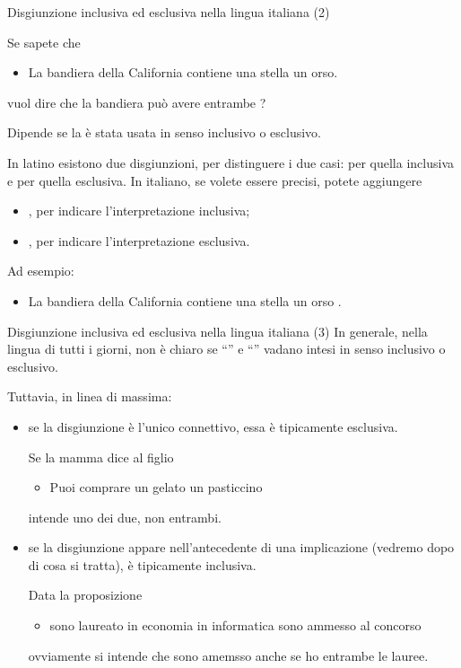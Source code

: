 \documentclass[aspectratio=169,10pt,dvipsnames,handout]{beamer}
\begin{document}
\begin{frame}{Disgiunzione inclusiva ed esclusiva nella lingua italiana (2)}
    \begin{example}
        Se sapete che
        \begin{itemize}
            \item La bandiera della California contiene una stella  un orso.
        \end{itemize}
        vuol dire che la bandiera può avere entrambe ?
    \end{example}

    \pause
    \medskip
    Dipende se la  è stata usata in senso inclusivo o esclusivo.

    \smallskip
    In latino esistono due disgiunzioni, per distinguere i due casi:  per quella inclusiva e  per quella esclusiva. In italiano, se volete essere precisi, potete aggiungere
    \begin{itemize}
        \item {}, per indicare l'interpretazione inclusiva;
        \item  {}, per indicare l'interpretazione esclusiva.
    \end{itemize}
    Ad esempio:
    \begin{itemize}
        \item La bandiera della California contiene una stella  un orso .
    \end{itemize}
\end{frame}

\begin{frame}{Disgiunzione inclusiva ed esclusiva nella lingua italiana (3)}
    In generale, nella lingua di tutti i giorni, non è chiaro se ``''  e ``'' vadano intesi in senso inclusivo o esclusivo.

    \medskip
    Tuttavia, in linea di massima:
    \begin{itemize}
        \item se la disgiunzione è l'unico connettivo, essa è tipicamente esclusiva.

        \medskip
        Se la mamma dice al figlio
        \begin{itemize}
            \item Puoi comprare un gelato  un pasticcino
        \end{itemize}
        intende uno dei due, non entrambi.

        \pause
        \item se la disgiunzione appare nell'antecedente di una implicazione (vedremo dopo di cosa si tratta), è tipicamente inclusiva.

            \medskip
        Data la proposizione
        \begin{itemize}
            \item {} sono laureato in economia  in informatica sono ammesso al concorso
        \end{itemize}
        ovviamente si intende che sono amemsso anche se ho entrambe le lauree.
    \end{itemize}
\end{frame}
\end{document}
